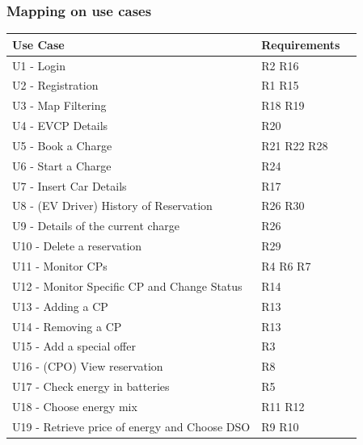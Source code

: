 \subsubsection{Mapping on use cases}
\begin{table}[H]
    \begin{tabularx}{\textwidth}{XXX}
        \toprule
        \textbf{Use Case}                             & \textbf{Requirements} \\ \midrule
        U1 - Login                                    & R2 R16                \\
        U2 - Registration                             & R1 R15                \\
        U3 - Map Filtering                            & R18 R19               \\
        U4 - EVCP Details                             & R20                   \\
        U5 - Book a Charge                            & R21 R22 R28           \\
        U6 - Start a Charge                           & R24                   \\
        U7 - Insert Car Details                       & R17                   \\
        U8 - (EV Driver) History of Reservation       & R26 R30               \\
        U9 - Details of the current charge            & R26                   \\
        U10 - Delete a reservation                    & R29                   \\
        U11 - Monitor CPs                             & R4 R6 R7              \\
        U12 - Monitor Specific CP and Change Status   & R14                   \\
        U13 - Adding a CP                             & R13                   \\
        U14 - Removing a CP                           & R13                   \\
        U15 - Add a special offer                     & R3                    \\
        U16 - (CPO) View reservation                  & R8                    \\
        U17 - Check energy in batteries               & R5                    \\
        U18 - Choose energy mix                       & R11 R12               \\
        U19 - Retrieve price of energy and Choose DSO & R9 R10                \\
        \bottomrule
    \end{tabularx}
\end{table}


